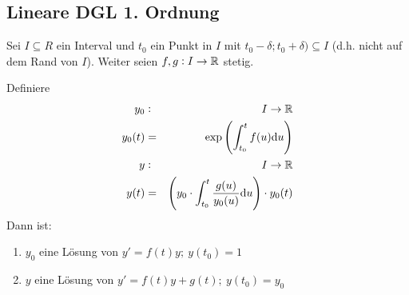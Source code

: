 \subsection{Lineare DGL 1. Ordnung}
Sei $I \subseteq R$ ein Interval und $t_0$ ein Punkt in $I$ mit $t_0 - \delta;
t_0+\delta) \subseteq I$ (d.h. nicht auf dem Rand von $I$). Weiter seien
$f,g: I \rightarrow \mathbb{R}$ stetig.

Definiere
\begin{eqnarray*}
    y_0&:& I \rightarrow \mathbb{R}\\
    y_0(t) &=& \exp{\left(\int_{t_0}^t f(u) \text{d}u \right)}\\
    y&:&I \rightarrow \mathbb{R}\\
    y(t)&=&\left(y_0 \cdot \int_{t_0}^t \dfrac{g(u)}{y_0(u)} \text{d}u\right) \cdot
        y_0(t)
\end{eqnarray*}
Dann ist:
\begin{enumerate}[label= (\alph*)]
    \item $y_0$ eine Lösung von $y' = f(t)y;\ y(t_0)=1$
    \item $y$ eine Lösung von $y' = f(t)y + g(t);\ y(t_0)=y_0$
\end{enumerate}
